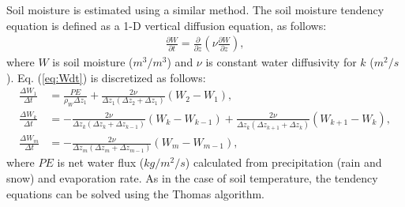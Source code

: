 Soil moisture is estimated using a similar method.
The soil moisture tendency equation is defined as a 1-D vertical diffusion equation, as follows:
\begin{align}
  \frac{\partial W}{\partial t} = \frac{\partial}{\partial z} \left( \nu \frac{\partial W}{\partial z} \right),
  \label{eq:Wdt}
\end{align}
where $W$ is soil moisture ($m^3/m^3$) and $\nu$ is constant water diffusivity for $k$ ($m^2/s$).
Eq. (\ref{eq:Wdt}) is discretized as follows:
\begin{align}
  \frac{\Delta W_{1}}{\Delta t} &= \frac{PE}{\rho_{W}\Delta z_{1}} + \frac{2\nu}{\Delta z_{1}(\Delta z_{2}+\Delta z_{1})} (W_{2}-W_{1}), \\
  \frac{\Delta W_{k}}{\Delta t} &= - \frac{2\nu}{\Delta z_{k}(\Delta z_{k}+\Delta z_{k-1})} (W_{k}-W_{k-1}) + \frac{2\nu}{\Delta z_{k}(\Delta z_{k+1}+\Delta z_{k})} (W_{k+1}-W_{k}), \\
  \frac{\Delta W_{m}}{\Delta t} &= - \frac{2\nu}{\Delta z_{m}(\Delta z_{m}+\Delta z_{m-1})} (W_{m}-W_{m-1}),
\end{align}
where $PE$ is net water flux ($kg/m^2/s$) calculated from precipitation (rain and snow) and evaporation rate.
As in the case of soil temperature, the tendency equations can be solved using the Thomas algorithm.

